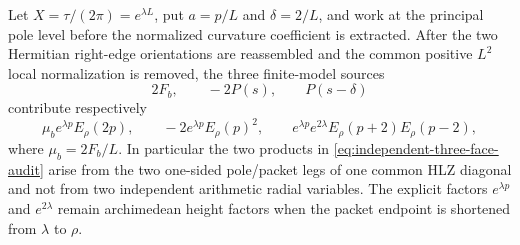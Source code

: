 \begin{lemma}
\label{lem:finite-model-face-audit}
Let $X=\tau/(2\pi)=e^{\lambda L}$, put $a=p/L$ and
$\delta=2/L$, and work at the principal pole level before the normalized
curvature coefficient is extracted.  After the two Hermitian right-edge
orientations are reassembled and the common positive $L^2$ local normalization
is removed, the three finite-model sources
\[
2F_b,\qquad -2P(s),\qquad P(s-\delta)
\]
contribute respectively
\begin{equation}
\boxed{
\mu_b e^{\lambda p}E_\rho(2p),\qquad
-2e^{\lambda p}E_\rho(p)^2,\qquad
e^{\lambda p}e^{2\lambda}E_\rho(p+2)E_\rho(p-2),
}
\label{eq:independent-three-face-audit}
\end{equation}
where $\mu_b=2F_b/L$.  In particular the two products in
\eqref{eq:independent-three-face-audit} arise from the two one-sided pole/packet
legs of one common HLZ diagonal and not from two independent arithmetic radial
variables.  The explicit factors $e^{\lambda p}$ and $e^{2\lambda}$ remain
archimedean height factors when the packet endpoint is shortened from
$\lambda$ to $\rho$.
\end{lemma}

